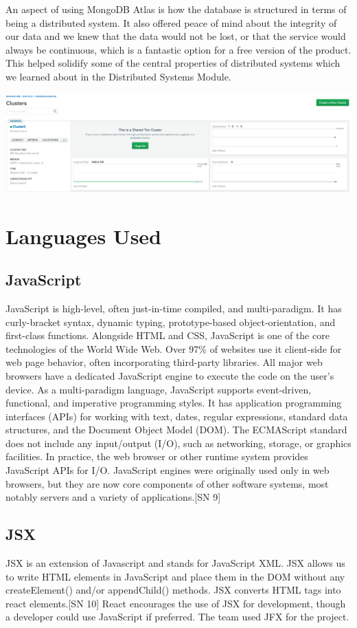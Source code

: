 An aspect of using MongoDB Atlas is how the database is structured in terms of being a distributed system. It also offered peace of mind about the integrity of our data and we knew that the data would not be lost, or that the service would always be continuous, which is a fantastic option for a free version of the product.
This helped solidify  some of the central properties of distributed systems which we learned about in the Distributed Systems Module.
\begin{center}
      \includegraphics[scale=0.5]{img/clusterDB.PNG}
\end{center}

\section{Languages Used}
\subsection{JavaScript}
JavaScript is high-level, often just-in-time compiled, and multi-paradigm. It has curly-bracket syntax, dynamic typing, prototype-based object-orientation, and first-class functions.
Alongside HTML and CSS, JavaScript is one of the core technologies of the World Wide Web. Over 97\% of websites use it client-side for web page behavior, often incorporating third-party libraries. All major web browsers have a dedicated JavaScript engine to execute the code on the user's device.
As a multi-paradigm language, JavaScript supports event-driven, functional, and imperative programming styles. It has application programming interfaces (APIs) for working with text, dates, regular expressions, standard data structures, and the Document Object Model (DOM).
The ECMAScript standard does not include any input/output (I/O), such as networking, storage, or graphics facilities. In practice, the web browser or other runtime system provides JavaScript APIs for I/O.
JavaScript engines were originally used only in web browsers, but they are now core components of other software systems, most notably servers and a variety of applications.[SN 9]
\subsection{JSX}
JSX is an extension of Javascript and stands for JavaScript XML.
JSX allows us to write HTML elements in JavaScript and place them in the DOM without any createElement()  and/or appendChild() methods. JSX converts HTML tags into react elements.[SN 10]
React encourages the use of JSX for development, though a developer could use JavaScript if preferred.
The team used JFX for the project.

